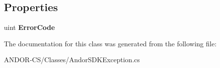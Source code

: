 \subsection*{Properties}
\begin{DoxyCompactItemize}
\item 
\mbox{\label{class_a_n_d_o_r___c_s_1_1_andor_s_d_k_exception_a9f0daf06d8b767ee02fc16d64a3c1d44}} 
uint {\bfseries Error\+Code}
\end{DoxyCompactItemize}


The documentation for this class was generated from the following file\+:\begin{DoxyCompactItemize}
\item 
A\+N\+D\+O\+R-\/\+C\+S/\+Classes/Andor\+S\+D\+K\+Exception.\+cs\end{DoxyCompactItemize}
